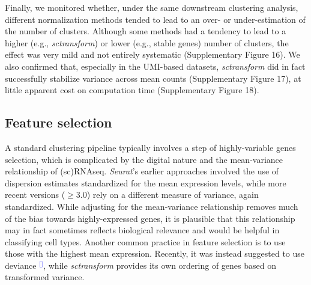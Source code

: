\documentclass[11pt]{article}
\renewcommand{\cite}[1]{\textcolor{Blue}{$^[$\supercite{#1}$^]$}}
\begin{document}
Finally, we monitored whether, under the same downstream clustering analysis, different normalization methods tended to lead to an over- or under-estimation of the number of clusters. Although some methods had a tendency to lead to a higher (e.g., \textit{sctransform}) or lower (e.g., stable genes) number of clusters, the effect was very mild and not entirely systematic (Supplementary Figure 16). We also confirmed that, especially in the UMI-based datasets, \textit{sctransform} did in fact successfully stabilize variance across mean counts (Supplementary Figure 17), at little apparent cost on computation time (Supplementary Figure 18).

\subsection*{Feature selection}

A standard clustering pipeline typically involves a step of highly-variable genes selection, which is complicated by the digital nature and the mean-variance relationship of (sc)RNAseq. \textit{Seurat}'s earlier approaches involved the use of dispersion estimates standardized for the mean expression levels, while more recent versions ($\geq$3.0) rely on a different measure of variance, again standardized. While adjusting for the mean-variance relationship removes much of the bias towards highly-expressed genes, it is plausible that this relationship may in fact sometimes reflects biological relevance and would be helpful in classifying cell types. Another common practice in feature selection is to use those with the highest mean expression. Recently, it was instead suggested to use deviance \cite{townesGlmpca2019}, while \textit{sctransform} provides its own ordering of genes based on transformed variance.
\end{document}
